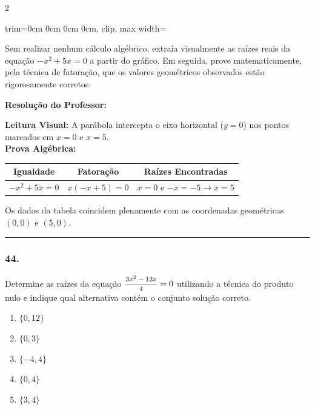 \begin{multicols*}{2}
\begin{center}
\begin{adjustbox}{trim=0cm 0cm 0cm 0cm, clip, max width=\larguraTikz}
\end{adjustbox}
\end{center}

Sem realizar nenhum cálculo algébrico, extraia visualmente as raízes reais da equação $ -x^2 + 5x = 0 $ a partir do gráfico. Em seguida, prove matematicamente, pela técnica de fatoração, que os valores geométricos observados estão rigorosamente corretos.

\ifgabarito
    \begin{tcolorbox}[colback=CorTitUm!5, colframe=CorTitUm, boxrule=1pt, arc=4pt, left=6pt, right=6pt, top=6pt, bottom=6pt]
    \small\textbf{\textcolor{CorTitUm}{Resolução do Professor:}}\par\vspace{0.1cm}
    \color{CinzaEscuro}
    \textbf{Leitura Visual:} A parábola intercepta o eixo horizontal ($y=0$) nos pontos marcados em $x = 0$ e $x = 5$.\\
    \textbf{Prova Algébrica:}
    \vspace{0.1cm}
    \begin{center}
    \begin{tabular}{|c|c|c|}
    \hline
    \textbf{Igualdade} & \textbf{Fatoração} & \textbf{Raízes Encontradas} \\
    \hline
    $-x^2 + 5x = 0$ & $x(-x + 5) = 0$ & $x=0$ e $-x = -5 \rightarrow x=5$ \\
    \hline
    \end{tabular}
    \end{center}
    Os dados da tabela coincidem plenamente com as coordenadas geométricas $(0,0)$ e $(5,0)$.
    \end{tcolorbox}
\fi

\par\vspace{\espacoQuestao}

\noindent\textcolor{CorLinha}{\rule{\linewidth}{0.5pt}} 
\par\vspace{\espacoPreQuestao}
\subsubsection*{44.} Determine as raízes da equação $ \mfrac{3x^2 - 12x}{4} = 0 $ utilizando a técnica do produto nulo e indique qual alternativa contém o conjunto solução correto.
\begin{enumerate}[label=\alph*), itemsep=\espacoAlt]
    \item $ \{0, 12\} $
    \item $ \{0, 3\} $
    \item $ \{-4, 4\} $
    \item $ \{0, 4\} $
    \item $ \{3, 4\} $
\end{enumerate}


\end{multicols*}
